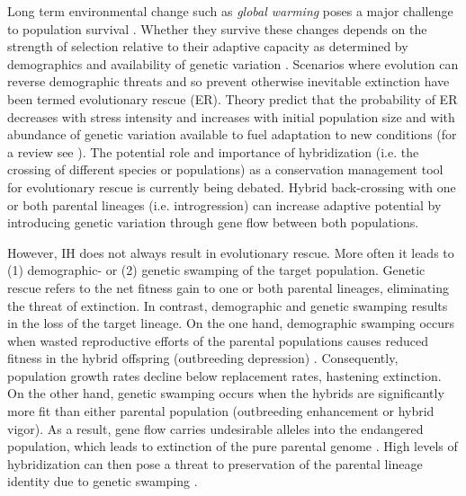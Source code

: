 \documentclass[a4paper,10pt]{article}
\begin{document}
   	Long term environmental change such as \textit{global warming} poses a major challenge to population survival \cite{parmesan2006ecological} \cite{hughes2000biological}. Whether they survive these changes depends on the strength of selection relative to their adaptive capacity as determined by demographics and availability of genetic variation \cite{lynch1993evolution} \cite{gomulkiewicz1995does} \cite{orr2008population}. Scenarios where evolution can reverse demographic threats and so prevent otherwise inevitable extinction have been termed evolutionary rescue (ER). Theory predict that the probability of ER decreases with stress intensity and increases with initial population size and with abundance of genetic variation available to fuel adaptation to new conditions (for a review see \cite{bell2008adaptation}). The potential role and importance of hybridization (i.e. the crossing of different species or populations) as a conservation management tool for evolutionary rescue is currently being debated. Hybrid back-crossing with one or both parental lineages (i.e. introgression) can increase adaptive potential by introducing genetic variation through gene flow between both populations.
	
	However, IH does not always result in evolutionary rescue. More often it leads to (1) demographic- or (2) genetic swamping of the target population. Genetic rescue refers to the net fitness gain to one or both parental lineages, eliminating the threat of extinction. In contrast, demographic and genetic swamping results in the loss of the target lineage. On the one hand, demographic swamping occurs when wasted reproductive efforts of the parental populations causes reduced fitness in the hybrid offspring (outbreeding depression) \cite{wolf2001predicting}. Consequently, population growth rates decline below replacement rates, hastening extinction. On the other hand, genetic swamping occurs when the hybrids are significantly more fit than either parental population (outbreeding enhancement or hybrid vigor). As a result, gene flow carries undesirable alleles into the endangered population, which leads to extinction of the pure parental genome \cite{woodruff1987fifty} \cite{allendorf2001problems}. High levels of hybridization can then pose a threat to preservation of the parental lineage identity due to genetic swamping \cite{rhymer1996extinction}.
	
\end{document}
